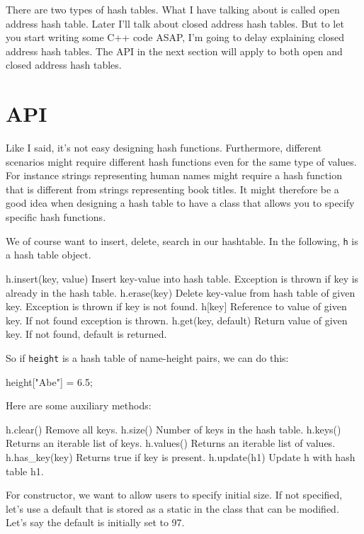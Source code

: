 There are two types of hash tables.
What I have talking about is called open address hash table.
Later I'll talk about closed address hash tables.
But to let you start writing some C++ code ASAP, 
I'm going to delay explaining closed address hash tables.
The API in the next section will apply to both open and closed
address hash tables.




\newpage
\section{API}

Like I said, it's not easy designing hash functions.
Furthermore, different scenarios might require different hash functions
even for the same type of values.
For instance strings representing human names might
require a hash function that is different from
strings representing book titles.
It might therefore be a good idea when designing a hash table 
to have a class that allows you to specify specific hash functions.

We of course want to insert, delete, search in our hashtable.
In the following, \verb!h! is a hash table object.
\begin{console}
h.insert(key, value) Insert key-value into hash table. 
                     Exception is thrown if key is 
                     already in the hash table.
h.erase(key)         Delete key-value from hash table of 
                     given key.
                     Exception is thrown if key is not 
                     found.
h[key]               Reference to value of given key.
                     If not found exception is thrown.
h.get(key, default)  Return value of given key. If not 
                     found, default is returned.
\end{console}
So if \verb!height! is a hash table of name-height pairs,
we can do this:
\begin{console}
height["Abe"] = 6.5;
\end{console}
Here are some auxiliary methods:
\begin{console}
h.clear()            Remove all keys.
h.size()             Number of keys in the hash table.
h.keys()             Returns an iterable list of keys.
h.values()           Returns an iterable list of values.
h.has_key(key)       Returns true if key is present.
h.update(h1)         Update h with hash table h1.
\end{console}


For constructor, we want to allow users to specify initial size.
If not specified, let's use a default that is stored as a static 
in the class that can be modified. 
Let's say the default is initially set to 97.




